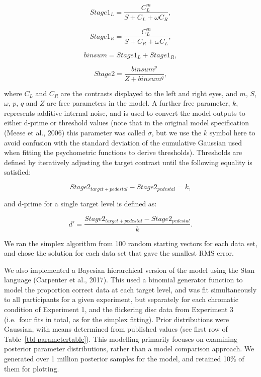 \documentclass[
  letterpaper,
  DIV=11,
  numbers=noendperiod]{scrartcl}
\begin{document}
\begin{equation}
Stage1_L = \frac{C_L^m}{S + C_L + \omega C_R},
\end{equation}

\begin{equation}
Stage1_R = \frac{C_L^m}{S + C_R + \omega C_L},
\end{equation}

\begin{equation}
binsum = Stage1_L + Stage1_R,
\end{equation}

\begin{equation}
Stage2 = \frac{binsum^p}{Z + binsum^q},
\end{equation}

where \(C_L\) and \(C_R\) are the contrasts displayed to the left and
right eyes, and \(m\), \(S\), \(\omega\), \(p\), \(q\) and \(Z\) are
free parameters in the model. A further free parameter, \(k\),
represents additive internal noise, and is used to convert the model
outputs to either d-prime or threshold values (note that in the original
model specification (Meese et al., 2006) this parameter was called
\(\sigma\), but we use the \(k\) symbol here to avoid confusion with the
standard deviation of the cumulative Gaussian used when fitting the
psychometric functions to derive thresholds). Thresholds are defined by
iteratively adjusting the target contrast until the following equality
is satisfied:

\begin{equation}
Stage2_{target+pedestal} - Stage2_{pedestal} = k,
\end{equation}

and d-prime for a single target level is defined as:

\begin{equation}
d' = \frac{Stage2_{target+pedestal} - Stage2_{pedestal}}{k}.
\end{equation}

We ran the simplex algorithm from 100 random starting vectors for each
data set, and chose the solution for each data set that gave the
smallest RMS error.

We also implemented a Bayesian hierarchical version of the model using
the Stan language (Carpenter et al., 2017). This used a binomial
generator function to model the proportion correct data at each target
level, and was fit simultaneously to all participants for a given
experiment, but separately for each chromatic condition of Experiment 1,
and the flickering disc data from Experiment 3 (i.e.~four fits in total,
as for the simplex fitting). Prior distributions were Gaussian, with
means determined from published values (see first row of
Table~\ref{tbl-parametertable}). This modelling primarily focuses on
examining posterior parameter distributions, rather than a model
comparison approach. We generated over 1 million posterior samples for
the model, and retained 10\% of them for plotting.
\end{document}

